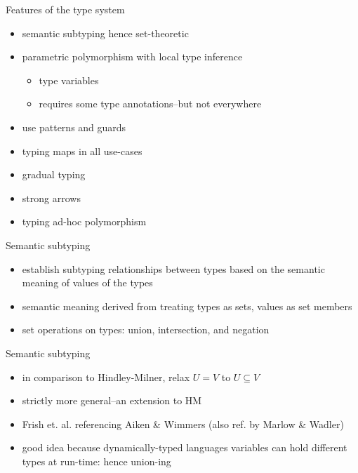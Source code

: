 \documentclass[
  ignorenonframetext,
  aspectratio=169]{beamer}
\providecommand{\tightlist}{%
  \setlength{\itemsep}{0pt}\setlength{\parskip}{0pt}}
\begin{document}
\begin{frame}{Features of the type system}
\label{features-of-the-type-system}
\begin{itemize}
\tightlist
\item
  semantic subtyping hence set-theoretic
\item
  parametric polymorphism with local type inference

  \begin{itemize}
  \tightlist
  \item
    type variables
  \item
    requires some type annotations--but not everywhere
  \end{itemize}
\item
  use patterns and guards
\item
  typing maps in all use-cases
\item
  gradual typing
\item
  strong arrows
\item
  typing ad-hoc polymorphism
\end{itemize}
\end{frame}

\begin{frame}{Semantic subtyping}
\label{semantic-subtyping}
\begin{itemize}
\tightlist
\item
  establish subtyping relationships between types based on the semantic
  meaning of values of the types
\item
  semantic meaning derived from treating types as sets, values as set
  members
\item
  set operations on types: union, intersection, and negation
\end{itemize}
\end{frame}

\begin{frame}{Semantic subtyping}
\label{semantic-subtyping-1}
\begin{itemize}
\tightlist
\item
  in comparison to Hindley-Milner, relax \(U = V\) to \(U \subseteq V\)
\item
  strictly more general--an extension to HM
\item
  Frish et. al. referencing Aiken \& Wimmers (also ref. by Marlow \&
  Wadler)
\item
  good idea because dynamically-typed languages variables can hold
  different types at run-time: hence union-ing
\end{itemize}
\end{frame}
\end{document}
